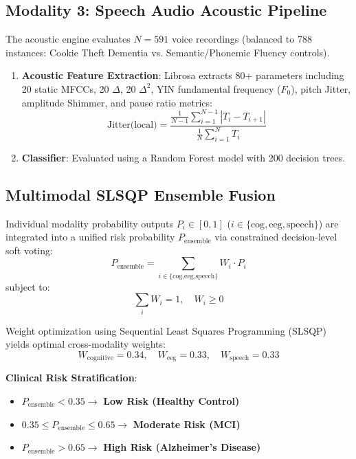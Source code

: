 \documentclass[conference]{IEEEtran}
\begin{document}
\subsection{Modality 3: Speech Audio Acoustic Pipeline}
The acoustic engine evaluates $N = 591$ voice recordings (balanced to 788 instances: Cookie Theft Dementia vs. Semantic/Phonemic Fluency controls).
\begin{enumerate}
    \item \textbf{Acoustic Feature Extraction}: Librosa extracts 80+ parameters including 20 static MFCCs, 20 $\Delta$, 20 $\Delta^2$, YIN fundamental frequency ($F_0$), pitch Jitter, amplitude Shimmer, and pause ratio metrics:
    \begin{equation}
    \text{Jitter(local)} = \frac{\frac{1}{N-1}\sum_{i=1}^{N-1} |T_i - T_{i+1}|}{\frac{1}{N}\sum_{i=1}^N T_i}
    \end{equation}
    \item \textbf{Classifier}: Evaluated using a Random Forest model with 200 decision trees.
\end{enumerate}

\subsection{Multimodal SLSQP Ensemble Fusion}
Individual modality probability outputs $P_i \in [0, 1]$ ($i \in \{\text{cog}, \text{eeg}, \text{speech}\}$) are integrated into a unified risk probability $P_{\text{ensemble}}$ via constrained decision-level soft voting:
\begin{equation}
P_{\text{ensemble}} = \sum_{i \in \{\text{cog,eeg,speech}\}} W_i \cdot P_i
\end{equation}
subject to:
\begin{equation}
\sum_i W_i = 1, \quad W_i \ge 0
\end{equation}

Weight optimization using Sequential Least Squares Programming (SLSQP) yields optimal cross-modality weights:
\begin{equation}
W_{\text{cognitive}} = 0.34, \quad W_{\text{eeg}} = 0.33, \quad W_{\text{speech}} = 0.33
\end{equation}

\textbf{Clinical Risk Stratification}:
\begin{itemize}
    \item $P_{\text{ensemble}} < 0.35 \rightarrow$ \textbf{Low Risk (Healthy Control)}
    \item $0.35 \le P_{\text{ensemble}} \le 0.65 \rightarrow$ \textbf{Moderate Risk (MCI)}
    \item $P_{\text{ensemble}} > 0.65 \rightarrow$ \textbf{High Risk (Alzheimer's Disease)}
\end{itemize}
\end{document}
